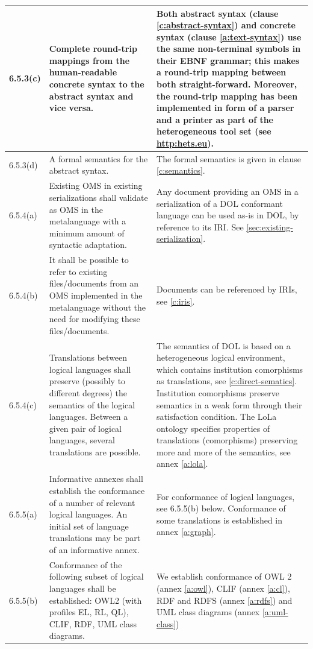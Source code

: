 \documentclass[10pt,fleqn,%
\ifpretendfinal
final%
\else
draft%
\fi,
]{scrreprt}
\begin{document}
\begin{center}
\begin{longtable}{|p{}|p{}|p{}|}
%
6.5.3(c)& 
Complete round-trip mappings from the human-readable concrete syntax to the abstract syntax and
vice versa.	&
Both abstract syntax (clause \ref{c:abstract-syntax}) and concrete syntax (clause 
\ref{a:text-syntax}) use the same non-terminal symbols
in their EBNF grammar; this makes a round-trip mapping between both straight-forward. Moreover, the 
round-trip mapping has been implemented in form of a parser and a printer as part of the 
heterogeneous tool set (see \url{http:hets.eu}).
   \\ \hline
%
6.5.3(d)& 
A formal semantics for the abstract syntax.	&
The formal semantics is given in clause \ref{c:semantics}.
   \\ \hline
%
%
6.5.4(a)& 
Existing OMS in existing serializations shall validate as OMS in the metalanguage with a minimum
amount of syntactic adaptation.	& 
Any document providing an OMS in a serialization of a DOL conformant
language can be used as-is in DOL, by reference to its IRI.
See \ref{sec:existing-serialization}.
   \\ \hline
%
6.5.4(b)& 
It shall be possible to refer to existing files/documents from an OMS implemented in the
metalanguage without the need for modifying these files/documents.	&
Documents can be referenced by IRIs, see \ref{c:iris}.
   \\ \hline
%
6.5.4(c)& 
Translations between logical languages shall preserve (possibly to different degrees) the semantics
of the logical languages. Between a given pair of logical languages, several translations are
possible.	&
The semantics of DOL is based on a heterogeneous logical
environment, which contains institution comorphisms as translations, see \ref{c:direct-sematics}. 
Institution comorphisms preserve semantics
in a weak form through their satisfaction condition. The LoLa ontology specifies properties of 
translations (comorphisms) preserving more and more of the semantics, see annex 
\ref{a:lola}.
   \\ \hline
%
6.5.5(a)& 
Informative annexes shall establish the conformance of a number of relevant logical languages. An
initial set of language translations may be part of an informative annex.	&
For conformance of logical languages, see 6.5.5(b) below.
Conformance of some translations is established in annex \ref{a:graph}.
   \\ \hline
%
6.5.5(b)& 
Conformance of the following subset of logical languages  shall be established: OWL2 (with profiles
EL, RL, QL), CLIF, RDF, UML class diagrams.
	&
We establish conformance of OWL 2 (annex \ref{a:owl}), CLIF (annex \ref{a:cl}), RDF and RDFS (annex \ref{a:rdfs}) and UML class diagrams (annex \ref{a:uml-class}) 

\end{longtable}
\end{center}
\end{document}

